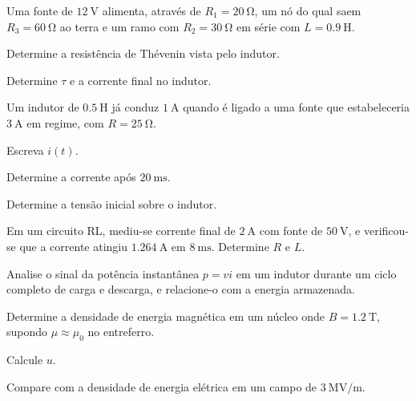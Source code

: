 \begin{questao}[3]{}

Uma fonte de $\SI{12}{\volt}$ alimenta, através de $R_1=\SI{20}{\ohm}$, um nó
do qual saem $R_3=\SI{60}{\ohm}$ ao terra e um ramo com
$R_2=\SI{30}{\ohm}$ em série com $L=\SI{0.9}{\henry}$.
\begin{itensq}
\item Determine a resistência de Thévenin vista pelo indutor.
\item Determine $\tau$ e a corrente final no indutor.
\end{itensq}


\end{questao}
\begin{questao}[3]{}

Um indutor de $\SI{0.5}{\henry}$ já conduz $\SI{1}{\ampere}$ quando é ligado a
uma fonte que estabeleceria $\SI{3}{\ampere}$ em regime, com
$R=\SI{25}{\ohm}$.
\begin{itensq}
\item Escreva $i(t)$.
\item Determine a corrente após $\SI{20}{\milli\second}$.
\item Determine a tensão inicial sobre o indutor.
\end{itensq}


\end{questao}
\begin{questao}[3]{}

Em um circuito RL, mediu-se corrente final de $\SI{2}{\ampere}$ com fonte de
$\SI{50}{\volt}$, e verificou-se que a corrente atingiu $\SI{1.264}{\ampere}$
em $\SI{8}{\milli\second}$. Determine $R$ e $L$.


\end{questao}
\begin{questao}[3]{}

Analise o sinal da potência instantânea $p=vi$ em um indutor durante um ciclo
completo de carga e descarga, e relacione-o com a energia armazenada.


\end{questao}
\begin{questao}[3]{}

Determine a densidade de energia magnética em um núcleo onde
$B=\SI{1.2}{\tesla}$, supondo $\mu\approx\mu_0$ no entreferro.
\begin{itensq}
\item Calcule $u$.
\item Compare com a densidade de energia elétrica em um campo de
      $\SI{3}{\mega\volt\per\meter}$.
\end{itensq}


\end{questao}
